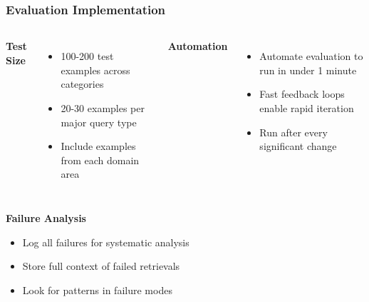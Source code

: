 \begin{frame}
    \frametitle{Evaluation Implementation}
    \begin{columns}
        \textbf{Test Size}
        \begin{itemize}
            \item 100-200 test examples across categories
            \item 20-30 examples per major query type
            \item Include examples from each domain area
        \end{itemize}
        
        \textbf{Automation}
        \begin{itemize}
            \item Automate evaluation to run in under 1 minute
            \item Fast feedback loops enable rapid iteration
            \item Run after every significant change
        \end{itemize}
    \end{columns}
    
    \vspace{0.5cm}
    \textbf{Failure Analysis}
    \begin{itemize}
        \item Log all failures for systematic analysis
        \item Store full context of failed retrievals
        \item Look for patterns in failure modes
    \end{itemize}
\end{frame}

